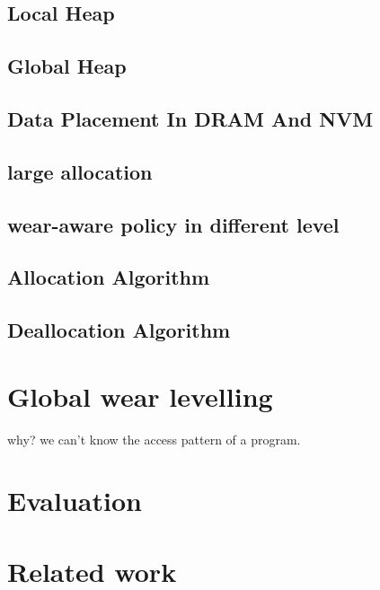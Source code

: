 \documentclass{vldb}
\begin{document}
\subsection{Local Heap}

\subsection{Global Heap}

\subsection{Data Placement In DRAM And NVM}


\subsection{large allocation}

\subsection{wear-aware policy in different level}


\subsection{Allocation Algorithm}

\subsection{Deallocation Algorithm}

\section{Global wear levelling}

why? we can’t know the access pattern of a program.

\section{Evaluation}

\section{Related work}
\end{document}
